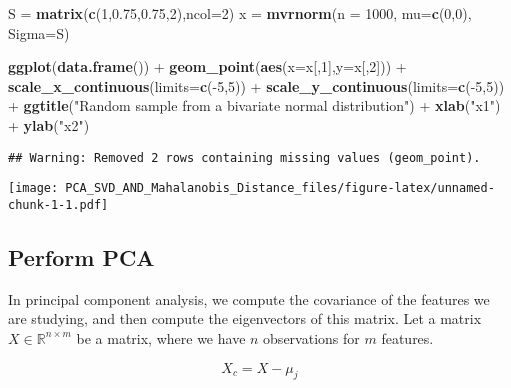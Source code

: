 \documentclass[]{article}
\newenvironment{Shaded}{\begin{snugshade}}{\end{snugshade}}
\newcommand{\KeywordTok}[1]{\textcolor[rgb]{0.13,0.29,0.53}{\textbf{{#1}}}}
\newcommand{\DataTypeTok}[1]{\textcolor[rgb]{0.13,0.29,0.53}{{#1}}}
\newcommand{\DecValTok}[1]{\textcolor[rgb]{0.00,0.00,0.81}{{#1}}}
\newcommand{\FloatTok}[1]{\textcolor[rgb]{0.00,0.00,0.81}{{#1}}}
\newcommand{\StringTok}[1]{\textcolor[rgb]{0.31,0.60,0.02}{{#1}}}
\newcommand{\NormalTok}[1]{{#1}}
\begin{document}
\begin{Shaded}
\begin{Highlighting}[]
\NormalTok{S =}\StringTok{ }\KeywordTok{matrix}\NormalTok{(}\KeywordTok{c}\NormalTok{(}\DecValTok{1}\NormalTok{,}\FloatTok{0.75}\NormalTok{,}\FloatTok{0.75}\NormalTok{,}\DecValTok{2}\NormalTok{),}\DataTypeTok{ncol=}\DecValTok{2}\NormalTok{)}
\NormalTok{x =}\StringTok{ }\KeywordTok{mvrnorm}\NormalTok{(}\DataTypeTok{n =} \DecValTok{1000}\NormalTok{, }\DataTypeTok{mu=}\KeywordTok{c}\NormalTok{(}\DecValTok{0}\NormalTok{,}\DecValTok{0}\NormalTok{), }\DataTypeTok{Sigma=}\NormalTok{S)}

\KeywordTok{ggplot}\NormalTok{(}\KeywordTok{data.frame}\NormalTok{()) +}\StringTok{ }\KeywordTok{geom_point}\NormalTok{(}\KeywordTok{aes}\NormalTok{(}\DataTypeTok{x=}\NormalTok{x[,}\DecValTok{1}\NormalTok{],}\DataTypeTok{y=}\NormalTok{x[,}\DecValTok{2}\NormalTok{])) +}\StringTok{ }\KeywordTok{scale_x_continuous}\NormalTok{(}\DataTypeTok{limits=}\KeywordTok{c}\NormalTok{(-}\DecValTok{5}\NormalTok{,}\DecValTok{5}\NormalTok{))  +}\StringTok{ }\KeywordTok{scale_y_continuous}\NormalTok{(}\DataTypeTok{limits=}\KeywordTok{c}\NormalTok{(-}\DecValTok{5}\NormalTok{,}\DecValTok{5}\NormalTok{)) +}
\StringTok{  }\KeywordTok{ggtitle}\NormalTok{(}\StringTok{"Random sample from a  bivariate normal distribution"}\NormalTok{) +}\StringTok{ }\KeywordTok{xlab}\NormalTok{(}\StringTok{"x1"}\NormalTok{) +}\StringTok{ }\KeywordTok{ylab}\NormalTok{(}\StringTok{"x2"}\NormalTok{)}
\end{Highlighting}
\end{Shaded}

\begin{verbatim}
## Warning: Removed 2 rows containing missing values (geom_point).
\end{verbatim}

\texttt{[image: PCA\_SVD\_AND\_Mahalanobis\_Distance\_files/figure-latex/unnamed-chunk-1-1.pdf]}

\subsection{Perform PCA}\label{perform-pca}

In principal component analysis, we compute the covariance of the
features we are studying, and then compute the eigenvectors of this
matrix. Let a matrix \(X \in \mathbb{R}^{n \times m}\) be a matrix,
where we have \(n\) observations for \(m\) features.

\begin{equation}
X_{c} = X - {\mu_j}
\end{equation}
\end{document}
